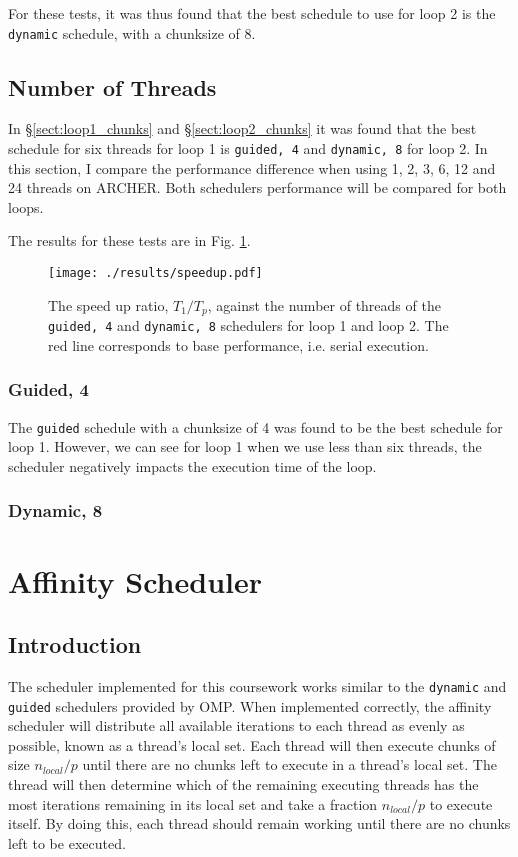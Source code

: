 \documentclass[11pt, a4paper]{article}
\begin{document}
				For these tests, it was thus found that the best schedule to use for loop 2 is the \texttt{dynamic} schedule, with a chunksize of 8.
											
		\subsection{Number of Threads}
			In \S\ref{sect:loop1_chunks} and \S\ref{sect:loop2_chunks} it was found that the best schedule for six threads for loop 1 is \texttt{guided, 4} and \texttt{dynamic, 8} for loop 2. In this section, I compare the performance difference when using 1, 2, 3, 6, 12 and 24 threads on ARCHER. Both schedulers performance will be compared for both loops.
			
			The results for these tests are in Fig. \ref{fig:n_threads}.\
			
			\begin{figure}
				\centering
				\texttt{[image: ./results/speedup.pdf]}
				\caption{The speed up ratio, $T_{1}/T_{p}$, against the number of threads of the \texttt{guided, 4} and \texttt{dynamic, 8} schedulers for loop 1 and loop 2. The red line corresponds to base performance, i.e. serial execution.}
				\label{fig:n_threads}
			\end{figure}
			
			\subsubsection{Guided, 4}
				The \texttt{guided} schedule with a chunksize of 4 was found to be the best schedule for loop 1. However, we can see for loop 1 when we use less than six threads, the scheduler negatively impacts the execution time of the loop.
			
			
			\subsubsection{Dynamic, 8}
			
			
	\section{Affinity Scheduler}
		\subsection{Introduction}
			The scheduler implemented for this coursework works similar to the \texttt{dynamic} and \texttt{guided} schedulers provided by OMP. When implemented correctly, the affinity scheduler will distribute all available iterations to each thread as evenly as possible, known as a thread's local set. Each thread will then execute chunks of size $n_{local}/p$ until there are no chunks left to execute in a thread's local set. The thread will then determine which of the remaining executing threads has the most iterations remaining in its local set and take a fraction $n_{local}/p$ to execute itself. By doing this, each thread should remain working until there are no chunks left to be executed.
			
\end{document}
